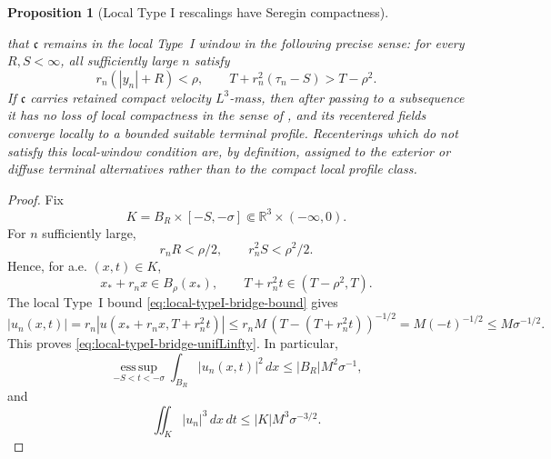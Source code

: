 \documentclass[11pt]{amsart}
\numberwithin{equation}{section}
\theoremstyle{plain}
\newtheorem{proposition}[theorem]{Proposition}
\theoremstyle{definition}
\theoremstyle{remark}
\newcommand{\R}{\mathbb R}
\newcommand{\esssup}{\operatorname*{ess\,sup}}
\begin{document}
\begin{proposition}[Local Type I rescalings have Seregin compactness]
\begin{enumerate}[label=\textup{(\roman*)}]
that \(\mathfrak c\) remains in the local Type~I window in the following
precise sense: for every \(R,S<\infty\), all sufficiently large \(n\) satisfy
\[
   r_n(|y_n|+R)<\rho,
   \qquad
   T+r_n^2(\tau_n-S)>T-\rho^2 .
\]
If \(\mathfrak c\) carries retained compact velocity \(L^3\)-mass, then after
passing to a subsequence it has no loss of local compactness in the sense of
, and its recentered fields converge locally to a
bounded suitable terminal profile.  Recenterings which do not satisfy this
local-window condition are, by definition, assigned to the exterior or diffuse
terminal alternatives rather than to the compact local profile class.
\end{enumerate}
\end{proposition}

\begin{proof}
Fix
\[
   K=B_R\times[-S,-\sigma]\Subset\R^3\times(-\infty,0).
\]
For \(n\) sufficiently large,
\[
   r_nR<\rho/2,\qquad r_n^2S<\rho^2/2.
\]
Hence, for a.e. \((x,t)\in K\),
\[
   x_*+r_nx\in B_\rho(x_*),
   \qquad
   T+r_n^2t\in(T-\rho^2,T).
\]
The local Type~I bound \eqref{eq:local-typeI-bridge-bound} gives
\[
   |u_n(x,t)|
   =r_n|u(x_*+r_nx,T+r_n^2t)|
   \le r_n M\,(T-(T+r_n^2t))^{-1/2}
   =M(-t)^{-1/2}
   \le M\sigma^{-1/2}.
\]
This proves \eqref{eq:local-typeI-bridge-unifLinfty}.  In particular,
\[
   \esssup_{-S<t<-\sigma}\int_{B_R}|u_n(x,t)|^2\,dx
   \le |B_R|M^2\sigma^{-1},
\]
and
\[
   \iint_K |u_n|^3\,dx\,dt
   \le |K|M^3\sigma^{-3/2}.
\]


\end{proof}
\end{document}
